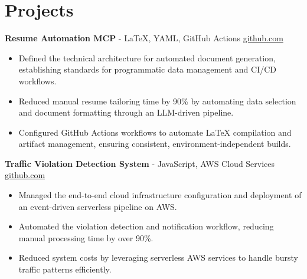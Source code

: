 \documentclass[11pt]{article}       %
\begin{document}

\vspace{-18.5pt}

\section*{Projects}

\textbf{Resume Automation MCP}{ - LaTeX, YAML, GitHub Actions} \hfill \href{https://github.com/Monica20030707/Tex_OrangeLeaf-mcp}{github.com} \\
\vspace{-9pt}
\begin{itemize}
  \item Defined the technical architecture for automated document generation, establishing standards for programmatic data management and CI/CD workflows.
  \item Reduced manual resume tailoring time by 90\% by automating data selection and document formatting through an LLM-driven pipeline.
  \item Configured GitHub Actions workflows to automate LaTeX compilation and artifact management, ensuring consistent, environment-independent builds.
\end{itemize}

\textbf{Traffic Violation Detection System}{ - JavaScript, AWS Cloud Services} \hfill \href{https://github.com/Monica20030707/AWS_rekonigition-N-read-database}{github.com} \\
\vspace{-9pt}
\begin{itemize}
  \item Managed the end-to-end cloud infrastructure configuration and deployment of an event-driven serverless pipeline on AWS.
  \item Automated the violation detection and notification workflow, reducing manual processing time by over 90\%.
  \item Reduced system costs by leveraging serverless AWS services to handle bursty traffic patterns efficiently.
\end{itemize}
\end{document}
